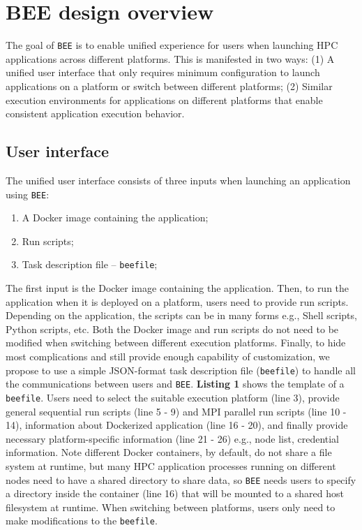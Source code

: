 

\section{BEE design overview}
\label{bee-framework-section}
The goal of \texttt{BEE} is to enable unified experience for users when launching HPC applications across different platforms. This is manifested in two ways: (1) A unified user interface that only requires minimum configuration to launch applications on a platform or switch between different platforms; (2) Similar execution environments for applications on different platforms that enable consistent application execution behavior.

\subsection{User interface}


The unified user interface consists of three inputs when launching an application using \texttt{BEE}:
\begin{enumerate}
\item A Docker image containing the application;
\item Run scripts;
\item Task description file -- \texttt{beefile};

\end{enumerate}
The first input is the Docker image containing the application. Then, to run the application when it is deployed on a platform, users need to provide run scripts. Depending on the application, the scripts can be in many forms e.g., Shell scripts, Python scripts, etc. Both the Docker image and run scripts do not need to be modified when switching between different execution platforms. Finally, to hide most complications and still provide enough capability of customization, we propose to use a simple JSON-format task description file (\texttt{beefile}) to handle all the communications between users and \texttt{BEE}. \textbf{Listing 1} shows the template of a \texttt{beefile}. Users need to select the suitable execution platform (line 3), provide general sequential run scripts (line 5 - 9) and MPI parallel run scripts (line 10 - 14), information about Dockerized  application (line 16 - 20), and finally provide necessary platform-specific information (line 21 - 26) e.g., node list, credential information. Note different Docker containers, by default, do not share a file system at runtime, but many HPC application processes running on different nodes need to have a shared directory to share data, so \texttt{BEE} needs users to specify a directory inside the container (line 16) that will be mounted to a shared host filesystem at runtime. When switching between platforms, users only need to make modifications to the \texttt{beefile}.

